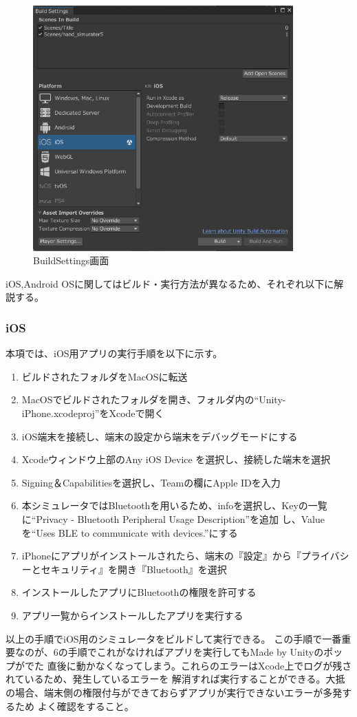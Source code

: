 \documentclass{ltjsreport}
\begin{document}
			\begin{figure}[H]
			\centering
			\includegraphics[width = 10cm]{../figs/BuildSettings.png}
			\caption{BuildSettings画面}
			\label{fig:BuildSettings}
			\end{figure}

			iOS,Android OSに関してはビルド・実行方法が異なるため、それぞれ以下に解説する。
			\subsubsection{iOS}
				本項では、iOS用アプリの実行手順を以下に示す。
				\begin{enumerate}
					\item ビルドされたフォルダをMacOSに転送
					\item MacOSでビルドされたフォルダを開き、フォルダ内の``Unity-iPhone.xcodeproj''をXcodeで開く
					\item iOS端末を接続し、端末の設定から端末をデバッグモードにする
					\item Xcodeウィンドウ上部のAny iOS Device を選択し、接続した端末を選択
					\item Signing＆Capabilitiesを選択し、Teamの欄にApple IDを入力
					\item 本シミュレータではBluetoothを用いるため、infoを選択し、Keyの一覧に``Privacy - Bluetooth Peripheral Usage Description''を追加
						し、Valueを``Uses BLE to communicate with devices.''にする
					\item iPhoneにアプリがインストールされたら、端末の『設定』から『プライバシーとセキュリティ』を開き『Bluetooth』を選択
					\item インストールしたアプリにBluetoothの権限を許可する
					\item アプリ一覧からインストールしたアプリを実行する
				\end{enumerate}
				以上の手順でiOS用のシミュレータをビルドして実行できる。
				この手順で一番重要なのが、6の手順でこれがなければアプリを実行してもMade by Unityのポップがでた
				直後に動かなくなってしまう。これらのエラーはXcode上でログが残されているため、発生しているエラーを
				解消すれば実行することができる。大抵の場合、端末側の権限付与ができておらずアプリが実行できないエラーが多発するため
				よく確認をすること。
\end{document}

